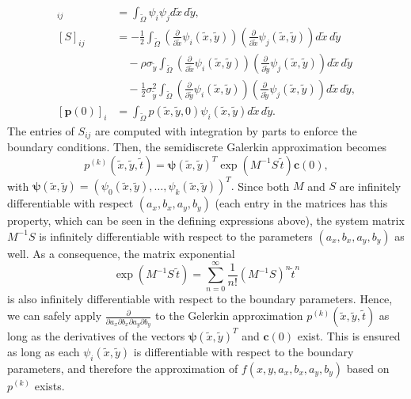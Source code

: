 \begin{align*}
  [M]_{ij} &= \displaystyle \int_{\tilde{\Omega}} \psi_i \psi_j d\tilde{x}\,d\tilde{y}, \\
  [S]_{ij} &= -\frac{1}{2} \displaystyle \int_{\tilde{\Omega}} \left( \frac{\partial}{\partial \tilde{x}} \psi_i(\tilde{x},\tilde{y}) \right) \left( \frac{\partial}{\partial \tilde{x}} \psi_j(\tilde{x},\tilde{y}) \right) d\tilde{x}\,d\tilde{y} \\
           &\quad -\rho\sigma_{\tilde{y}} \displaystyle \int_{\tilde{\Omega}} \left( \frac{\partial}{\partial \tilde{x}} \psi_i(\tilde{x},\tilde{y}) \right) \left( \frac{\partial}{\partial \tilde{y}} \psi_j(\tilde{x},\tilde{y}) \right) d\tilde{x}\,d\tilde{y} \\
           &\quad -\frac{1}{2}\sigma_{\tilde{y}}^2 \displaystyle \int_{\tilde{\Omega}} \left( \frac{\partial}{\partial \tilde{y}} \psi_i(\tilde{x},\tilde{y}) \right) \left( \frac{\partial}{\partial \tilde{y}} \psi_j(\tilde{x},\tilde{y}) \right) d\tilde{x}\,d\tilde{y}, \\
  [\mathbf{p}(0)]_i &= \displaystyle \int_{\tilde{\Omega}} p(\tilde{x},\tilde{y},0) \psi_i(\tilde{x},\tilde{y}) d\tilde{x}\,d\tilde{y}.
\end{align*}
The entries of $S_{ij}$ are computed with integration by parts to
enforce the boundary conditions. Then, the semidiscrete Galerkin approximation
becomes
\[
  p^{(k)}(\tilde{x},\tilde{y},\tilde{t}) = \boldsymbol{\psi}(\tilde{x},\tilde{y})^T \exp\left( M^{-1}S\, \tilde{t} \right) \mathbf{c}(0),
\]
with
$\boldsymbol{\psi}(\tilde{x},\tilde{y}) =
(\psi_0(\tilde{x},\tilde{y}), \ldots, \psi_k(\tilde{x},\tilde{y}))^T.$
Since both $M$ and $S$ are infinitely differentiable with respect
$(a_x, b_x, a_y, b_y)$ (each entry in the matrices has this property,
which can be seen in the defining expressions above), the system
matrix $M^{-1}S$ is infinitely differentiable with respect to the
parameters $(a_x, b_x, a_y, b_y)$ as well. As a consequence, the
matrix exponential
\[
  \exp\left( M^{-1}S\, \tilde{t} \right) = \sum_{n=0}^\infty \frac{1}{n!}
  \left(M^{-1}S\right)^n \tilde{t}^n
\]
is also infinitely differentiable with respect to the boundary
parameters. Hence, we can safely apply
$\frac{\partial}{\partial a_x \partial b_x \partial a_y \partial b_y}$
to the Gelerkin approximation $p^{(k)}(\tilde{x},\tilde{y},\tilde{t})$
as long as the derivatives of the vectors
$\boldsymbol{\psi}(\tilde{x},\tilde{y})^T$ and $\mathbf{c}(0)$
exist. This is ensured as long as each $\psi_i(\tilde{x},\tilde{y})$
is differentiable with respect to the boundary parameters, and
therefore the approximation of $f(x,y,a_x,b_x,a_y,b_y)$ based on
$p^{(k)}$ exists.


